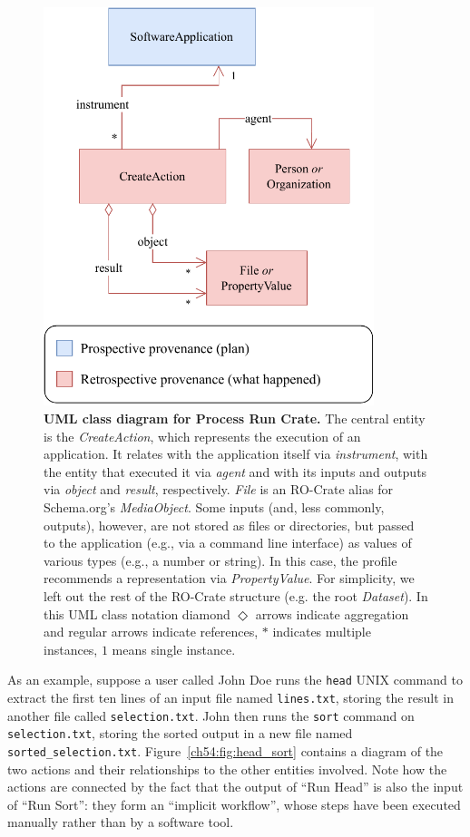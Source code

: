 \begin{figure}[htp]
\includegraphics[width=26em]{figures/ch54/wrroc-figure1.drawio.pdf}
\caption[UML class diagram for Process Run Crate]{{\bf UML class diagram for Process Run Crate.}
The central entity is the \emph{CreateAction}, which represents the execution of an application.
It relates with the application itself via \emph{instrument}, with the entity that executed it via \emph{agent} and with its inputs and outputs via \emph{object}
and \emph{result}, respectively. 
\emph{File} is an RO-Crate alias for Schema.org's \emph{MediaObject}.
Some inputs (and, less commonly, outputs), however, are not stored as files or directories, but passed to the application (e.g., via a command line interface) as values of various types (e.g., a number or string). In this case, the profile recommends a representation via \emph{PropertyValue}. 
For simplicity, we left out the rest of the RO-Crate structure (e.g. the root \emph{Dataset}). In this UML class notation diamond $\Diamond$ arrows indicate aggregation and regular arrows indicate references, $*$ indicates multiple instances, $1$ means single instance.  
}
\label{ch54:fig:process_crate_er}
\end{figure}

As an example,
suppose a user called John Doe runs the \texttt{head} UNIX command to extract the first ten lines of an input file named \texttt{lines.txt}, storing the result in another file called \texttt{selection.txt}.
John then runs the \texttt{sort}
command on \texttt{selection.txt}, storing the sorted output in a new file named \texttt{sorted\_selection.txt}.
Figure~\vref{ch54:fig:head_sort} contains a diagram of the two actions and their relationships to the other entities involved.
Note how the actions are connected by the fact that the output of ``Run Head'' is also the input of ``Run Sort'': they form an ``implicit workflow'', whose steps have been executed manually rather than by a software tool.

